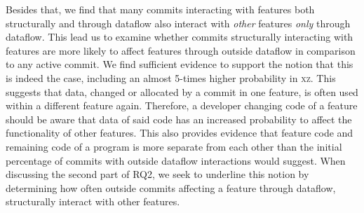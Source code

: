 Besides that, we find that many commits interacting with features both structurally and through dataflow also interact with \emph{other} features \emph{only} through dataflow.
This lead us to examine whether commits structurally interacting with features are more likely to affect features through outside dataflow in comparison to any active commit.
We find sufficient evidence to support the notion that this is indeed the case, including an almost 5-times higher probability in \textsc{xz}.
This suggests that data, changed or allocated by a commit in one feature, is often used within a different feature again.
Therefore, a developer changing code of a feature should be aware that data of said code has an increased probability to affect the functionality of other features.
This also provides evidence that feature code and remaining code of a program is more separate from each other than the initial percentage of commits with outside dataflow interactions would suggest.
When discussing the second part of RQ2, we seek to underline this notion by determining how often outside commits affecting a feature through dataflow, structurally interact with other features.

